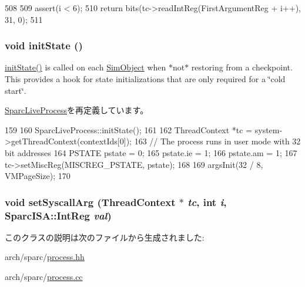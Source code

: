 \begin{DoxyCode}
508 {
509     assert(i < 6);
510     return bits(tc->readIntReg(FirstArgumentReg + i++), 31, 0);
511 }
\end{DoxyCode}
\hypertarget{classSparc32LiveProcess_a3c34ea9b29f410748d4435a667484924}{
\subsubsection[{initState}]{\setlength{\rightskip}{0pt plus 5cm}void initState ()}}
\label{classSparc32LiveProcess_a3c34ea9b29f410748d4435a667484924}
\hyperlink{classSparc32LiveProcess_a3c34ea9b29f410748d4435a667484924}{initState()} is called on each \hyperlink{classSimObject}{SimObject} when $\ast$not$\ast$ restoring from a checkpoint. This provides a hook for state initializations that are only required for a \char`\"{}cold start\char`\"{}. 

\hyperlink{classSparcLiveProcess_a3c34ea9b29f410748d4435a667484924}{SparcLiveProcess}を再定義しています。


\begin{DoxyCode}
159 {
160     SparcLiveProcess::initState();
161 
162     ThreadContext *tc = system->getThreadContext(contextIds[0]);
163     // The process runs in user mode with 32 bit addresses
164     PSTATE pstate = 0;
165     pstate.ie = 1;
166     pstate.am = 1;
167     tc->setMiscReg(MISCREG_PSTATE, pstate);
168 
169     argsInit(32 / 8, VMPageSize);
170 }
\end{DoxyCode}
\hypertarget{classSparc32LiveProcess_acab5265ebb2016965a75bd93006c36d3}{
\subsubsection[{setSyscallArg}]{\setlength{\rightskip}{0pt plus 5cm}void setSyscallArg ({\bf ThreadContext} $\ast$ {\em tc}, \/  int {\em i}, \/  {\bf SparcISA::IntReg} {\em val})}}
\label{classSparc32LiveProcess_acab5265ebb2016965a75bd93006c36d3}


このクラスの説明は次のファイルから生成されました:\begin{DoxyCompactItemize}
\item 
arch/sparc/\hyperlink{arch_2sparc_2process_8hh}{process.hh}\item 
arch/sparc/\hyperlink{arch_2sparc_2process_8cc}{process.cc}\end{DoxyCompactItemize}
